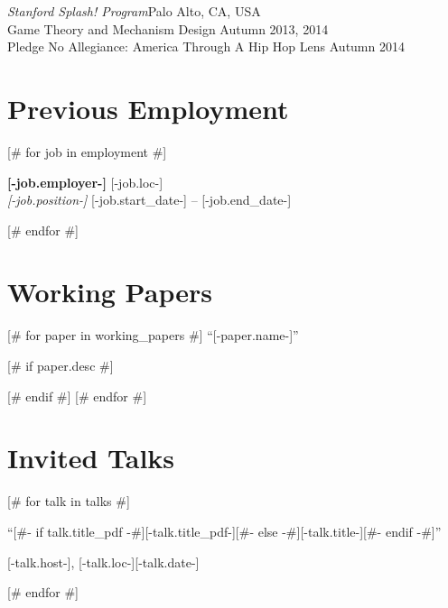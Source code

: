 \documentclass[letterpaper,11pt]{article}
\newcommand{\cvitemsep}{2mm}
\newcommand{\emplitemsep}{3mm}
\begin{document}
\begin{minipage}{\textwidth}
\begin{minipage}{\linewidth}
\vspace{2mm}\textit{Stanford Splash! Program}\hfill Palo Alto, CA, USA\vspace{2mm}\\
Game Theory and Mechanism Design \hfill Autumn 2013, 2014\vspace{1mm}\\
Pledge No Allegiance: America Through A Hip Hop Lens \hfill Autumn 2014\\

\end{minipage}

\section{Previous Employment}

[# for job in employment #]

	\textbf{[-job.employer-]} \hfill{} [-job.loc-]\\%
	\textsl{\small [-job.position-]} \hfill{} {\small [-job.start_date-] -- [-job.end_date-]}%
    \vspace{\emplitemsep}

[# endfor #]

\section{Working Papers}

[# for paper in working_papers #]
``[-paper.name-]''

[# if paper.desc #]
\begin{adjustwidth}{1cm}{}
	\vspace{\cvitemsep}
\end{adjustwidth}
[# endif #]
[# endfor #]


\section{Invited Talks}

[# for talk in talks #]
\begin{minipage}{\textwidth}
``[#- if talk.title_pdf -#][-talk.title_pdf-][#- else -#][-talk.title-][#- endif -#]''

\begin{adjustwidth}{1cm}{}
	{\small [-talk.host-], [-talk.loc-]}\hfill {\small [-talk.date-]}\vspace{3mm}
\end{adjustwidth}
\end{minipage}
[# endfor #]



\end{minipage}
\end{document}
